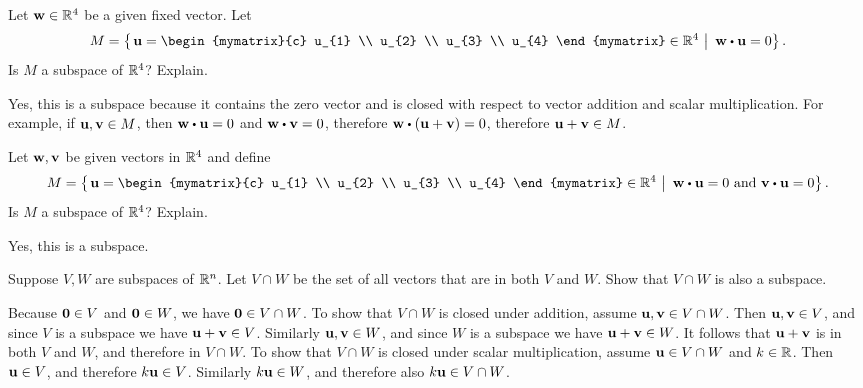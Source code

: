 \begin{ex}
  Let $\mbox{\bf w}\in \mathbb{R}^{4}$ be a given fixed vector. Let
  \begin{equation*}
    M=\set{\left.\vect{u}
        =\begin{mymatrix}{c}
          u_{1} \\ u_{2} \\ u_{3} \\ u_{4}
        \end{mymatrix} \in \R^{4}~\right\vert~ \vect{w}\dotprod \vect{u}
      =0}.
  \end{equation*}
  Is $M$ a subspace of $\mathbb{R}^4$? Explain.
  \begin{sol}
    Yes, this is a subspace because it contains the zero vector and is
    closed with respect to vector addition and scalar
    multiplication. For example, if $\mbox{\bf u},\mbox{\bf v}\in M$, then
    $\vect{w}\dotprod\vect{u}=0$ and $\vect{w}\dotprod\vect{v}=0$,
    therefore $\vect{w}\dotprod(\vect{u}+\vect{v})=0$, therefore
    $\mbox{\bf u}+\mbox{\bf v}\in M$.
  \end{sol}
\end{ex}

\begin{ex}
  Let $\mbox{\bf w},\mbox{\bf v}$ be given vectors in $\mathbb{R}^{4}$ and define
  \begin{equation*}
    M=\set{\left.\vect{u}=\begin{mymatrix}{c}
        u_{1} \\ u_{2} \\ u_{3} \\ u_{4}
      \end{mymatrix} \in \R
      ^{4}~\right\vert~ \vect{w}\dotprod \vect{u}=0\text{ and }\vect{v}\dotprod \vect{u}=0}
    .
  \end{equation*}
  Is $M$ a subspace of $\mathbb{R}^4$? Explain.
  \begin{sol}
    Yes, this is a subspace.
  \end{sol}
\end{ex}

\begin{ex}
  Suppose $V, W$ are subspaces of $\mathbb{R}^{n}$. Let $V\cap W$ be the set
  of all vectors that are in both $V$ and $W$. Show that $V\cap W$
  is also a subspace.
  \begin{sol}
    Because $\mbox{\bf 0}\in V$ and $\mbox{\bf 0}\in W$, we have
    $\mbox{\bf 0}\in V\cap W$. To show that $V\cap W$ is closed under
    addition, assume $\mbox{\bf u},\mbox{\bf v}\in V\cap W$. Then
    $\mbox{\bf u},\mbox{\bf v}\in V$, and since $V$ is a subspace we have
    $\mbox{\bf u}+\mbox{\bf v}\in V$. Similarly $\mbox{\bf u},\mbox{\bf v}\in W$, and
    since $W$ is a subspace we have $\mbox{\bf u}+\mbox{\bf v}\in W$. It
    follows that $\mbox{\bf u}+\mbox{\bf v}$ is in both $V$ and $W$, and
    therefore in $V\cap W$. To show that $V\cap W$ is closed under
    scalar multiplication, assume $\mbox{\bf u}\in V\cap W$ and
    $k\in\mathbb{R}$. Then $\mbox{\bf u}\in V$, and therefore $k\mbox{\bf u}\in
    V$. Similarly $k\mbox{\bf u}\in W$, and therefore also
    $k\mbox{\bf u}\in V\cap W$.
  \end{sol}
\end{ex}

